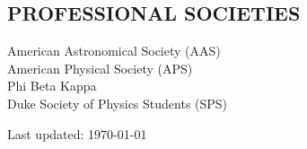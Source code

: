 \documentclass[margin]{res}
\begin{document}
\begin{resume}
\section{\normalfont PROFESSIONAL SOCIETIES}

American Astronomical Society (AAS) \\
American Physical Society (APS) \\
Phi Beta Kappa \\
Duke Society of Physics Students (SPS) \\


\vfill
\strut \hfill
Last updated: \today

\end{resume}
\(\)
\end{document}
